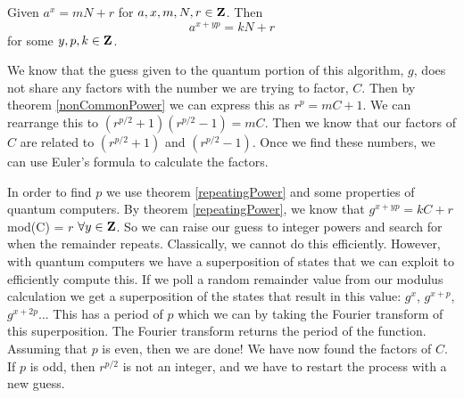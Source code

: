 \documentclass[a4paper]{article}
\begin{document}
\begin{theorem} %

Given $a^x = mN + r$ for $a,x,m,N,r \in \mathbf{Z}$. Then
$$a^{x + yp} = kN + r$$
for some $y,p,k \in \mathbf{Z}$.
\label{repeatingPower}
\end{theorem}

We know that the guess given to the quantum portion of this algorithm, $g$, does not share any factors with the number we are trying to factor, $C$. Then by theorem \ref{nonCommonPower} we can express this as $r^p = mC + 1$. We can rearrange this to $(r^{p/2} + 1)(r^{p/2} - 1) = mC$. Then we know that our factors of $C$ are related to $(r^{p/2} + 1)$ and $(r^{p/2} - 1)$. Once we find these numbers, we can use Euler's formula to calculate the factors. 

In order to find $p$ we use theorem \ref{repeatingPower} and some properties of quantum computers. By theorem \ref{repeatingPower}, we know that $g^{x + yp} = kC + r$ mod(C) = $r$ $\forall y \in \mathbf{Z}$. So we can raise our guess to integer powers and search for when the remainder repeats. Classically, we cannot do this efficiently. However, with quantum computers we have a superposition of states that we can exploit to efficiently compute this. If we poll a random remainder value from our modulus calculation we get a superposition of the states that result in this value: $g^{x}$, $g^{x + p}$, $g^{x+2p}$... This has a period of $p$ which we can by taking the Fourier transform of this superposition. The Fourier transform returns the period of the function. Assuming that $p$ is even, then we are done! We have now found the factors of $C$. If $p$ is odd, then $r^{p/2}$ is not an integer, and we have to restart the process with a new guess. 
\end{document}
